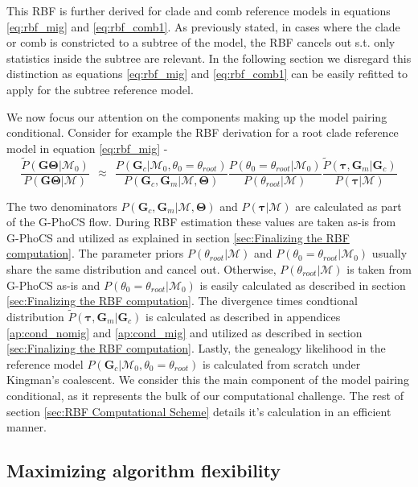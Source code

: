 \documentclass[11pt]{article}
\newcommand{\vect}[1]{\boldsymbol{\mathbf{#1}}}
\newcommand{\M}{\mathcal{M}}
\newcommand{\G}{\vect{G}}
\newcommand{\T}{\vect{\Theta}}
\newcommand{\GT}{\G\T}
\newcommand{\Pref}{\widetilde{P}}
\newcommand{\1}{\mathbbm{1}}
\newcommand{\troot}{\theta_{root}}
\newcommand{\Gc}{\G_c}
\newcommand{\Gm}{\G_m}
\newcommand{\gp}{G-PhoCS }
\newcommand{\taus}{\vect\tau}
\begin{document}
This RBF is further derived for clade and comb reference models in equations  \ref{eq:rbf_mig} and \ref{eq:rbf_comb1}. As previously stated, in cases where the clade or comb is constricted to a subtree of the model, the RBF cancels out s.t. only statistics inside the subtree are relevant. In the following section we disregard this distinction as equations  \ref{eq:rbf_mig} and \ref{eq:rbf_comb1} can be easily refitted to apply for the subtree reference model.

We now focus our attention on the components making up the model pairing conditional. Consider for example the RBF derivation for a root clade reference model in equation \ref{eq:rbf_mig} - 
\[ 
	\frac{\Pref(\GT|\M_0) }{P(\GT|\M)}
	~~\approx~~ 
	\frac{ P(\Gc|\M_0,\theta_0=\troot) }{ P(\Gc,\Gm|\M,\T)} 
	\frac{ P(\theta_0=\troot|\M_0)}{P(\troot|\M)}
	\frac{ \Pref(\taus,\Gm|\Gc)}{P(\taus|\M)}
\]

The two denominators $P(\Gc,\Gm|\M,\T)$ and $P(\taus|\M)$ are calculated as part of the \gp flow.
%
During RBF estimation these values are taken as-is from \gp and utilized as explained in section \ref{sec:Finalizing the RBF computation}.
%
%
The parameter priors $P(\troot|\M)$ and $P(\theta_0=\troot|\M_0)$ usually share the same distribution and cancel out. 
%
Otherwise, $P(\troot|\M)$ is taken from \gp as-is and $P(\theta_0=\troot|\M_0)$ is easily calculated as described in section \ref{sec:Finalizing the RBF computation}.
%
%
The divergence times condtional distribution $\Pref(\taus,\Gm|\Gc)$ is calculated as described in appendices \ref{ap:cond_nomig} and \ref{ap:cond_mig} and utilized as described in section \ref{sec:Finalizing the RBF computation}.
%
Lastly, the genealogy likelihood in the reference model $P(\Gc|\M_0,\theta_0=\troot)$ is calculated from scratch under Kingman's coalescent. 
%
We consider this the main component of the model pairing conditional, as it represents the bulk of our computational challenge. The rest of section \ref{sec:RBF Computational Scheme} details it's calculation in an efficient manner.

\subsection{Maximizing algorithm flexibility}
\end{document}
